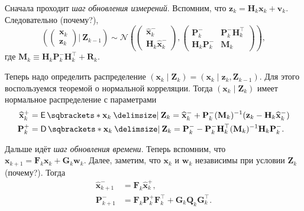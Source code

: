 Сначала проходит \emph{шаг обновления измерений}. Вспомним, что 
\(\mathbf{z}_{k}  = \mathbf{H}_{k}\mathbf{x}_{k} + \mathbf{v}_{k}\). 
Следовательно (почему?),
\[
	\left(
		\begin{pmatrix}
			\mathbf{x}_{k} \\ \mathbf{z}_{k}
		\end{pmatrix}
		\Bigg|\ 
		\mathbf{Z}_{k - 1}
	\right)
	\sim
	\mathcal{N}
	\left(
		\begin{pmatrix}
			\hat{\mathbf{x}}_{k}^{-} \\ \mathbf{H}_{k}\hat{\mathbf{x}}_{k}^{-}
		\end{pmatrix}
		,
		\begin{pmatrix}
			\mathbf{P}_{k}^{-} & \mathbf{P}_{k}^{-}\mathbf{H}_{k}^{\top} \\
			\mathbf{H}_{k}\mathbf{P}_{k}^{-} & \mathbf{M}_{k}
		\end{pmatrix}
	\right)
	,
\]
где \(\mathbf{M}_{k} \equiv \mathbf{H}_{k}\mathbf{P}_{k}^{-} 
\mathbf{H}_{k}^{\top} + \mathbf{R}_{k}\).

Теперь надо определить распределение \((\mathbf{x}_{k} \mid \mathbf{Z}_{k}) = 
(\mathbf{x}_{k} \mid \mathbf{z}_{k}, \mathbf{Z}_{k - 1})\). Для этого 
воспользуемся теоремой о нормальной корреляции. Тогда \((\mathbf{x}_{k} \mid 
\mathbf{Z}_{k})\) имеет нормальное распределение с параметрами
\begin{align*}
	\hat{\mathbf{x}}_{k}^{+} &= \E{\mathbf{x}_{k} \given \mathbf{Z}_{k}} = 
	\hat{\mathbf{x}}_{k}^{-} + \mathbf{P}_{k}^{-}(\mathbf{M}_{k})^{-1} 
	(\mathbf{z}_{k} - \mathbf{H}_{k}\hat{\mathbf{x}}_{k}^{-}) \\
	\mathbf{P}_{k}^{+} &= \D{\mathbf{x}_{k} \given \mathbf{Z}_{k}} = 
	\mathbf{P}_{k}^{-} - \mathbf{P}_{k}^{-}\mathbf{H}_{k}^{\top} 
	(\mathbf{M}_{k})^{-1}\mathbf{H}_{k}\mathbf{P}_{k}^{-}.
\end{align*}

Дальше идёт \emph{шаг обновления времени}. Теперь вспомним, что \(\mathbf{x}_{k 
+ 1} = \mathbf{F}_{k}\mathbf{x}_{k} + \mathbf{G}_{k}\mathbf{w}_{k}\). Далее, 
заметим, что \(\mathbf{x}_{k}\) и \(\mathbf{w}_{k}\) независимы при условии 
\(\mathbf{Z}_{k}\) (почему?). Тогда
\begin{align*}
	\hat{\mathbf{x}}_{k + 1}^{-} &= \mathbf{F}_{k}\hat{\mathbf{x}}_{k}^{+}, \\
	\mathbf{P}_{k + 1}^{-} &= \mathbf{F}_{k}\mathbf{P}_{k}^{+} 
	\mathbf{F}_{k}^{\top} + \mathbf{G}_{k}\mathbf{Q}_{k} 
	\mathbf{G}_{k}^{\top}.
\end{align*}


